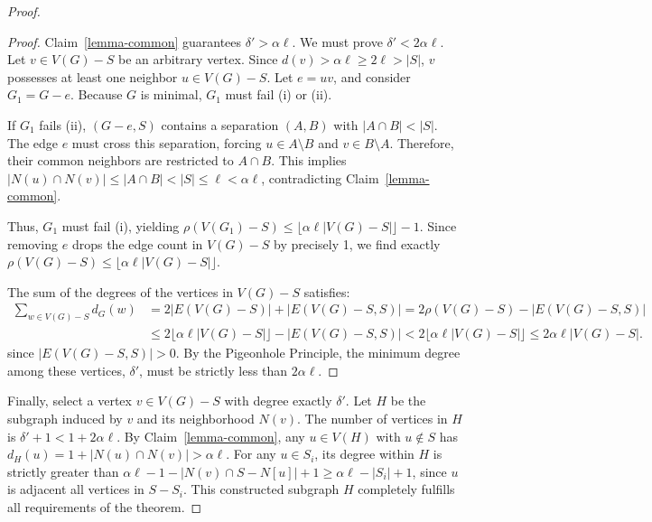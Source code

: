 \documentclass[11pt]{amsart}
\begin{document}
\begin{proof}
\begin{proof}
Claim~\ref{lemma-common} guarantees $\delta' > \alpha \ell$. We must prove $\delta' < 2\alpha \ell$. Let $v \in V(G)-S$ be an arbitrary vertex. Since $d(v) > \alpha \ell \ge 2\ell > |S|$, $v$ possesses at least one neighbor $u \in V(G)-S$. Let $e = uv$, and consider $G_1 = G-e$. Because $G$ is minimal, $G_1$ must fail (i) or (ii).

If $G_1$ fails (ii), $(G-e, S)$ contains a separation $(A,B)$ with $|A\cap B|<|S|$. The edge $e$ must cross this separation, forcing $u \in A\setminus B$ and $v \in B\setminus A$. Therefore, their common neighbors are restricted to $A\cap B$. This implies $|N(u)\cap N(v)| \le |A\cap B| < |S| \le \ell < \alpha \ell$, contradicting Claim~\ref{lemma-common}.

Thus, $G_1$ must fail (i), yielding $\rho(V(G_1)-S) \le \lfloor\alpha \ell |V(G)-S|\rfloor - 1$. Since removing $e$ drops the edge count in $V(G)-S$ by precisely 1, we find exactly $\rho(V(G)-S) \le \lfloor\alpha \ell |V(G)-S|\rfloor$.




The sum of the degrees of the vertices in $V(G)-S$ satisfies:
\begin{align*} \sum_{w \in V(G)-S} d_G(w) &= 2|E(V(G)-S)| + |E(V(G)-S, S)| = 2\rho(V(G)-S) - |E(V(G)-S, S)|\\ 
&\le 2\lfloor\alpha \ell |V(G)-S|\rfloor -|E(V(G)-S, S)| < 2\lfloor\alpha \ell |V(G)-S|\rfloor\le 2\alpha \ell |V(G)-S|. \end{align*}
since $|E(V(G)-S, S)|> 0$.
By the Pigeonhole Principle, the minimum degree among these vertices, $\delta'$, must be strictly less than $2\alpha \ell$.
\end{proof}

Finally, select a vertex $v\in V(G)-S$ with degree exactly $\delta'$. Let $H$ be the subgraph induced by $v$ and its neighborhood $N(v)$. The number of vertices in $H$ is $\delta'+1<1+ 2\alpha \ell$. 
By Claim~\ref{lemma-common}, any $u \in V(H)$ with $u \notin S$ has $d_H(u) = 1 + |N(u) \cap N(v)| > \alpha \ell$. For any $u \in S_i$, its degree within $H$ is strictly greater than $\alpha \ell - 1 - |N(v) \cap S - N[u]| + 1 \ge \alpha \ell - |S_i|+1$, since $u$ is adjacent all vertices in $S-S_i$. 
This constructed subgraph $H$ completely fulfills all requirements of the theorem.
\end{proof}
\end{document}
